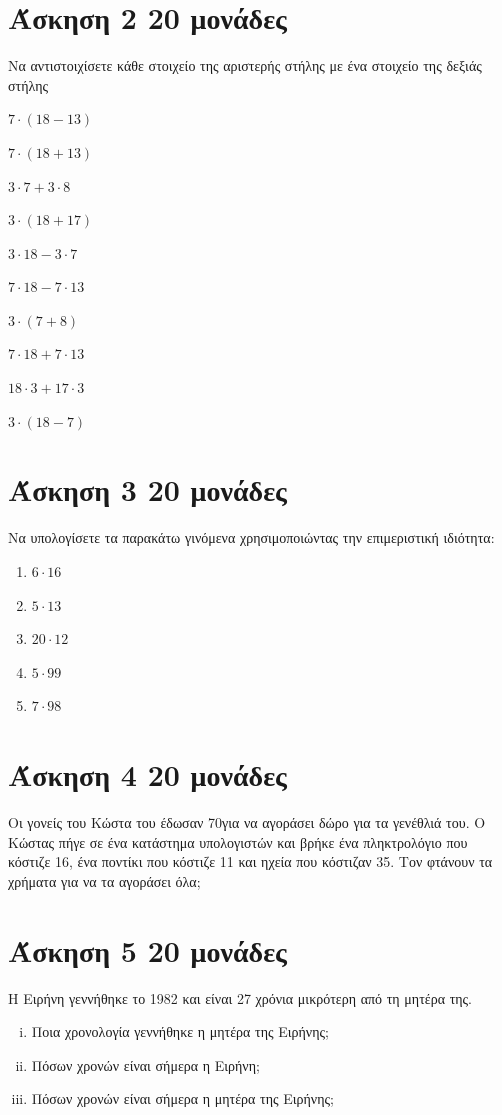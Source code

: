 \documentclass[a4paper,10pt]{report}
\begin{document}
\section*{Άσκηση 2  \hfill \small{}20  μονάδες}
Να αντιστοιχίσετε κάθε στοιχείο της αριστερής στήλης με ένα στοιχείο της δεξιάς στήλης
\begin{itemize}
\begin{multicols}{2}
 \item $7\cdot(18-13)$
 \item $7\cdot(18+13)$
 \item $3\cdot7+3\cdot8$
 \item $3\cdot(18+17)$
 \item $3\cdot18-3\cdot7$
 \item $7\cdot18-7\cdot13$
 \item $3\cdot(7+8)$
 \item $7\cdot18+7\cdot13$
 \item $18\cdot3+17\cdot3$
 \item $3\cdot(18-7)$
\end{multicols}
\end{itemize}

\section*{Άσκηση 3  \hfill \small{}20 μονάδες}
Να υπολογίσετε τα παρακάτω γινόμενα χρησιμοποιώντας την επιμεριστική ιδιότητα: 
\begin{enumerate} [1)]
 \item $6\cdot 16$
 \item $5\cdot 13$
 \item $20\cdot 12$
 \item $5\cdot 99$
 \item $7\cdot 98$
\end{enumerate}



\section*{Άσκηση 4  \hfill \small{}20 μονάδες}
Οι γονείς του Κώστα του έδωσαν 70\texteuro για να αγοράσει δώρο για τα γενέθλιά του. Ο Κώστας πήγε σε ένα 
κατάστημα υπολογιστών και βρήκε ένα πληκτρολόγιο που κόστιζε 16\texteuro, ένα ποντίκι που κόστιζε 11\texteuro 
και ηχεία που κόστιζαν 35\texteuro. Τον φτάνουν τα χρήματα για να τα αγοράσει όλα;



\section*{Άσκηση 5  \hfill \small{}20  μονάδες}
Η Ειρήνη γεννήθηκε το 1982 και είναι 27 χρόνια μικρότερη από τη μητέρα της.
\begin{enumerate}[i)]
 \item Ποια χρονολογία γεννήθηκε η μητέρα της Ειρήνης;
 \item Πόσων χρονών είναι σήμερα η Ειρήνη;
 \item Πόσων χρονών είναι σήμερα η μητέρα της Ειρήνης;
\end{enumerate}
\end{document}

